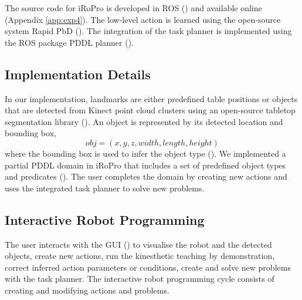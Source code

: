The source code for iRoPro is developed in ROS (\cite{quigley2009ros}) and available online (Appendix \ref{app:exp4}). %
The low-level action is learned using the open-source system Rapid PbD (\cite{rapidpbd}).
The integration of the task planner is implemented using the ROS package PDDL planner (\cite{pddlplanner}).

\subsection{Implementation Details}
\label{sec:implementation}
In our implementation, landmarks are either predefined table positions or 
objects that are detected from Kinect point cloud clusters using an open-source tabletop segmentation library (\cite{surfaceperception}).
An object is represented by its detected location and bounding box, \ie 
$$obj = (x,y,z, width, length, height)$$ 
where the bounding box is used to infer the object type ().
We implemented a partial PDDL domain in iRoPro that includes a set of predefined object types and predicates ().
The user completes the domain by creating new actions and uses the integrated task planner to solve new problems.


\subsection{Interactive Robot Programming}
\label{sec:interactive}
The user interacts with the GUI () to visualise the robot and the detected objects, create new actions, run the kinesthetic teaching by demonstration, correct inferred action parameters or conditions, create and solve new problems with the task planner.
The interactive robot programming cycle consists of creating and modifying actions and problems.

